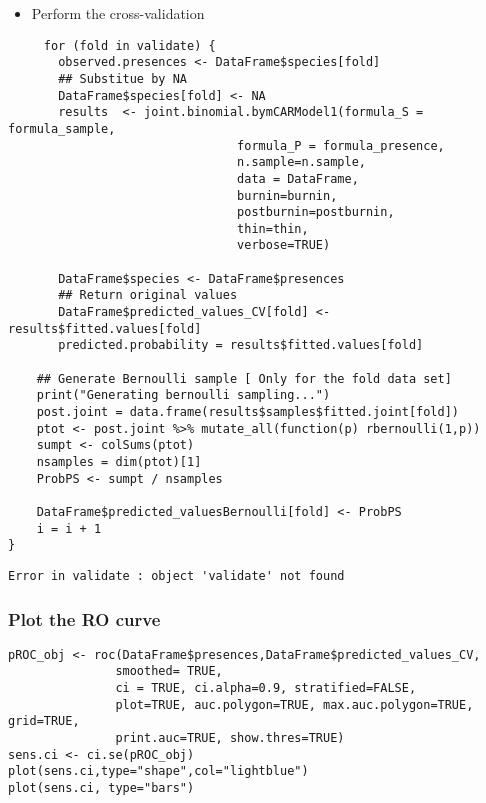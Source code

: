 \documentclass[11pt]{article}
\begin{document}
\begin{enumerate}
\begin{itemize}
\item Perform the cross-validation
\end{itemize}
\begin{verbatim}
     for (fold in validate) {
       observed.presences <- DataFrame$species[fold]
       ## Substitue by NA
       DataFrame$species[fold] <- NA
       results  <- joint.binomial.bymCARModel1(formula_S = formula_sample,
                                formula_P = formula_presence,
                                n.sample=n.sample,
                                data = DataFrame,
                                burnin=burnin,
                                postburnin=postburnin,
                                thin=thin,
                                verbose=TRUE)

       DataFrame$species <- DataFrame$presences
       ## Return original values
       DataFrame$predicted_values_CV[fold] <- results$fitted.values[fold]
       predicted.probability = results$fitted.values[fold]

    ## Generate Bernoulli sample [ Only for the fold data set]
    print("Generating bernoulli sampling...")
    post.joint = data.frame(results$samples$fitted.joint[fold])
    ptot <- post.joint %>% mutate_all(function(p) rbernoulli(1,p))
    sumpt <- colSums(ptot)
    nsamples = dim(ptot)[1]
    ProbPS <- sumpt / nsamples

    DataFrame$predicted_valuesBernoulli[fold] <- ProbPS
    i = i + 1
}
\end{verbatim}
\end{enumerate}

\begin{verbatim}
Error in validate : object 'validate' not found
\end{verbatim}

\subsubsection{Plot the RO curve}
\label{sec:org7f37ee3}
\begin{verbatim}
pROC_obj <- roc(DataFrame$presences,DataFrame$predicted_values_CV,
               smoothed= TRUE,
               ci = TRUE, ci.alpha=0.9, stratified=FALSE,
               plot=TRUE, auc.polygon=TRUE, max.auc.polygon=TRUE, grid=TRUE,
               print.auc=TRUE, show.thres=TRUE)
sens.ci <- ci.se(pROC_obj)
plot(sens.ci,type="shape",col="lightblue")
plot(sens.ci, type="bars")
\end{verbatim}
\end{document}
